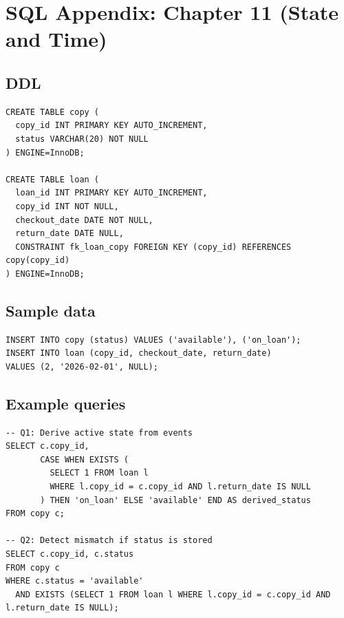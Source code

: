 \chapter{SQL Appendix: Chapter 11 (State and Time)}

\section{DDL}
\begin{verbatim}
CREATE TABLE copy (
  copy_id INT PRIMARY KEY AUTO_INCREMENT,
  status VARCHAR(20) NOT NULL
) ENGINE=InnoDB;

CREATE TABLE loan (
  loan_id INT PRIMARY KEY AUTO_INCREMENT,
  copy_id INT NOT NULL,
  checkout_date DATE NOT NULL,
  return_date DATE NULL,
  CONSTRAINT fk_loan_copy FOREIGN KEY (copy_id) REFERENCES copy(copy_id)
) ENGINE=InnoDB;
\end{verbatim}

\section{Sample data}
\begin{verbatim}
INSERT INTO copy (status) VALUES ('available'), ('on_loan');
INSERT INTO loan (copy_id, checkout_date, return_date)
VALUES (2, '2026-02-01', NULL);
\end{verbatim}

\section{Example queries}
\begin{verbatim}
-- Q1: Derive active state from events
SELECT c.copy_id,
       CASE WHEN EXISTS (
         SELECT 1 FROM loan l
         WHERE l.copy_id = c.copy_id AND l.return_date IS NULL
       ) THEN 'on_loan' ELSE 'available' END AS derived_status
FROM copy c;

-- Q2: Detect mismatch if status is stored
SELECT c.copy_id, c.status
FROM copy c
WHERE c.status = 'available'
  AND EXISTS (SELECT 1 FROM loan l WHERE l.copy_id = c.copy_id AND l.return_date IS NULL);
\end{verbatim}
